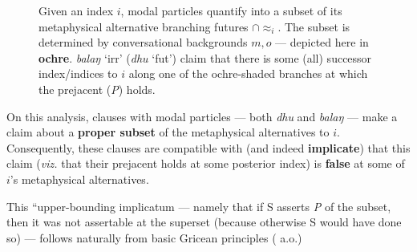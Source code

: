 \begin{figure}[h]\caption{Given an index $ i $, modal particles quantify into a subset of its metaphysical alternative branching futures $ \cap\approx_i $. The subset is determined by conversational backgrounds $ m,o $ --- depicted here in {\color{ochre}\textbf{ochre}}. \textit{balaŋ} `\gls{irr}' (\textit{dhu} `\gls{fut}') claim that there is some (all) successor index/indices to $ i $ along one of the ochre-shaded branches at which the prejacent (\textit{P}) holds.}\label{nonverid}
\centering
{}\end{figure}


On this analysis, clauses with modal particles --- both \textit{dhu} and \textit{balaŋ} --- make a claim about a \textbf{proper subset} of the metaphysical alternatives to $ i $. Consequently, these clauses are compatible with (and indeed \textbf{implicate}) that this claim (\textit{viz.} that their prejacent holds at some posterior index) is \textbf{false} at some of $ i $'s metaphysical alternatives.

This ``upper-bounding implicatum --- namely that if \textsf{S} asserts \textit{P} of the subset, then it was not assertable at the superset (because otherwise \textsf{S} would have done so) --- follows naturally from basic Gricean principles (\citealp[see][]{Horn1984} a.o.)

